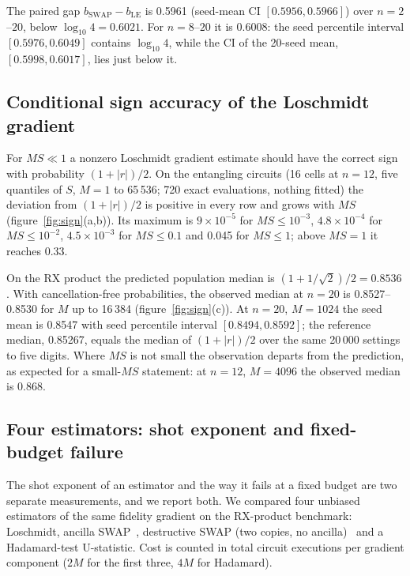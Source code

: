 The paired gap $b_{\mathrm{SWAP}} - b_{\mathrm{LE}}$ is 0.5961 (seed-mean CI $[0.5956, 0.5966]$) over $n = 2$--$20$,
below $\log_{10}4 = 0.6021$. For $n = 8$--$20$ it is 0.6008: the seed percentile interval $[0.5976, 0.6049]$
contains $\log_{10}4$, while the CI of the 20-seed mean, $[0.5998, 0.6017]$, lies just below it.

\subsection{Conditional sign accuracy of the Loschmidt gradient}
\label{sec:results-sign}

For $MS \ll 1$ a nonzero Loschmidt gradient estimate should have the correct sign with probability $(1+|r|)/2$.
On the entangling circuits (16 cells at $n = 12$, five quantiles of $S$, $M = 1$ to 65\,536; 720 exact evaluations,
nothing fitted) the deviation from $(1+|r|)/2$ is positive in every row and grows with $MS$
(figure~\ref{fig:sign}(a,b)). Its maximum is $9\times10^{-5}$ for $MS \le 10^{-3}$, $4.8\times10^{-4}$ for
$MS \le 10^{-2}$, $4.5\times10^{-3}$ for $MS \le 0.1$ and 0.045 for $MS \le 1$; above $MS = 1$ it reaches 0.33.

On the RX product the predicted population median is $(1+1/\sqrt2)/2 = 0.8536$. With cancellation-free
probabilities, the observed median at $n = 20$ is 0.8527--0.8530 for $M$ up to 16\,384 (figure~\ref{fig:sign}(c)).
At $n = 20$, $M = 1024$ the seed mean is 0.8547 with seed percentile interval $[0.8494, 0.8592]$; the reference
median, 0.85267, equals the median of $(1+|r|)/2$ over the same 20\,000 settings to five digits. Where $MS$ is not
small the observation departs from the prediction, as expected for a small-$MS$ statement: at $n = 12$, $M = 4096$ the
observed median is 0.868.

\subsection{Four estimators: shot exponent and fixed-budget failure}
\label{sec:results-b2}

The shot exponent of an estimator and the way it fails at a fixed budget are two separate measurements, and we
report both.
We compared four unbiased estimators of the same fidelity gradient on the RX-product benchmark: Loschmidt, ancilla
SWAP~\cite{buhrman2001}, destructive SWAP (two copies, no ancilla)~\cite{garciaescartin2013} and a Hadamard-test U-statistic. Cost is counted in total circuit
executions per gradient component ($2M$ for the first three, $4M$ for Hadamard).

